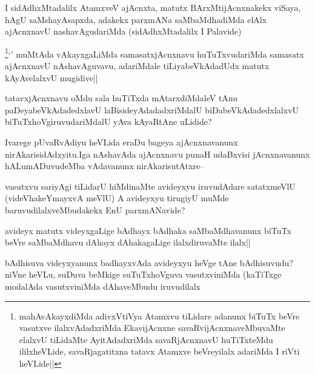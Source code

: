 
\begin{artha}
I sidAdhxMtadalilx AtamxveV ajAcnxta, matutx BArxMtijAcnxnakekx viSaya, hAgU saMshayAsapxda, adakekx parxmANa saMbaMdhadiMda elAlx ajAcnxnavU nashavAgudariMda (sidAdhxMtadalilx I Palavide)
\end{artha}

\begin{artha}
\footnote{mahAvAkayxdiMda adivxVtiVya Atamxvu tiLidare adanunx biTuTx beVre vasutxve ilalxvAdadxriMda EkavijAcnxne savaRvijAcnxnaveMbuvaMte elalxvU tiLidaMte AyitAdadxriMda savaRjAcnxnavU huTiTxteMdu ililxheVLide, savaRjagatitxna tatavx Atamxve beVreyilalx adariMda I riVti heVLide||}`\stext' muMtAda vAkayxgaLiMda samasatxjAcnxnavu huTuTxvudariMda samasatx ajAcnxnavU nAshavAguvavu, adariMdale tiLiyabeVkAdadUdx matutx kAyAvelalxvU mugidive||
\end{artha}


\begin{artha}
tatavxjAcnxnavu oMdu sala huTiTxda mAtarxdiMdaleV tAnu paDeyabeVkAdadedxlavU laBisideyAdadadxriMdalU biDabeVkAdadedxlalxvU biTuTxhoVgiruvudariMdalU yAva kAyaRtAne uLidide?
\end{artha}

\begin{artha}
Ivarege pUvaRvAdiyu heVLida eraDu bageya ajAcnxnavanunx nirAkarisidAdxyitu.Iga nAshavAda ajAcnxnavu  punaH udaBxvisi jAcnxnavanunx hALumADuvudeMba vAdavanunx nirAkarisutAtxre--
\end{artha}

\begin{artha}
vasutxvu sariyAgi tiLidarU hiMdinaMte avideyxyu iruvudAdare satatxmeVlU (videVhakeYmayxvA meVlU) A avideyxyu tirugiyU muMde baruvudilalxveMbudakekx EnU parxmANavide?
\end{artha}

\begin{artha}
avideyx matutx videyxgaLige bAdhayx bAdhaka saMbaMdhavanunx biTuTx beVre saMbaMdhavu dAhayx dAhakagaLige ilalxdiruvaMte ilalx||
\end{artha}


\begin{artha}
bAdhisuva videyxyanunx badhayxvAda avideyxyu heVge tAne bAdhisuvudu? niVne heVLu, suDuva beMkige suTuTxhoVguva vasutxviniMda (kaTiTxge modalAda vasutxviniMda dAhaveMbudu iruvudilalx
\end{artha}

